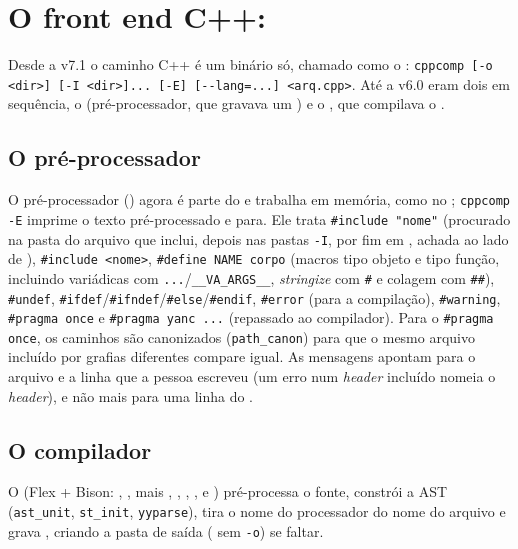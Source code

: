 \section{O front end C++: }
\label{sec:yanc-cpp}

Desde a v7.1 o caminho C++ é um binário só, chamado como o :
\lstinline|cppcomp [-o <dir>] [-I <dir>]... [-E] [--lang=...] <arq.cpp>|. Até a
v6.0 eram dois em sequência, o  (pré-processador, que gravava um
) e o , que compilava o .

\subsection{O pré-processador}
\label{sec:yanc-cpppp}

O pré-processador () agora é parte do
 e trabalha em memória, como no ; \lstinline|cppcomp -E|
imprime o texto pré-processado e para. Ele trata \lstinline|#include "nome"|
(procurado na pasta do arquivo que inclui, depois nas pastas \lstinline|-I|, por
fim em , achada ao lado de ), \lstinline|#include <nome>|,
\lstinline|#define NAME corpo| (macros tipo objeto e tipo função, incluindo
variádicas com \lstinline|...|/\lstinline|__VA_ARGS__|, \emph{stringize} com
\lstinline|#| e colagem com \lstinline|##|), \lstinline|#undef|,
\lstinline|#ifdef|/\lstinline|#ifndef|/\lstinline|#else|/\lstinline|#endif|,
\lstinline|#error| (para a compilação), \lstinline|#warning|,
\lstinline|#pragma once| e \lstinline|#pragma yanc ...| (repassado ao compilador).
Para o \lstinline|#pragma once|, os caminhos são canonizados
(\lstinline|path_canon|) para que o mesmo arquivo incluído por grafias diferentes
compare igual. As mensagens apontam para o arquivo e a linha que a pessoa escreveu
(um erro num \emph{header} incluído nomeia o \emph{header}), e não mais para uma
linha do .

\subsection{O compilador}
\label{sec:yanc-cppcomp}

O  (Flex + Bison: , , mais
, , , ,  e
) pré-processa o fonte, constrói a AST (\lstinline|ast_unit|,
\lstinline|st_init|, \lstinline|yyparse|), tira o nome do processador do nome do
arquivo e grava , criando a pasta de saída
( sem \lstinline|-o|) se faltar.


